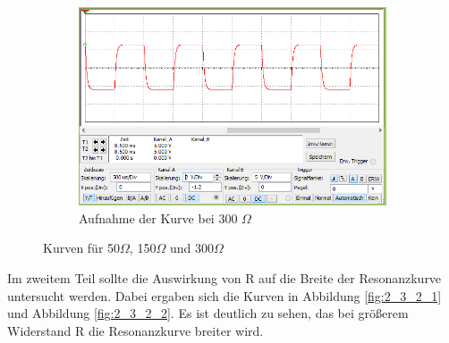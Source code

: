 \documentclass[12pt,a4paper]{article}
\begin{document}
\begin{figure}[H]
        \hfill
        \begin{subfigure}[b]{0.28\textwidth}
                \includegraphics[width=\textwidth , scale = 0.4]{2_3_widerstand_300Ohm.PNG}
                \caption[Aufnahme der Kurve bei 300 $\Omega$]{Aufnahme der Kurve bei 300 $\Omega$}
  				\label{fig:2_3_300}
        \end{subfigure}
        \caption{Kurven  für 50$\Omega$, 150$\Omega$ und 300$\Omega$}
        \label{fig:2_3_1}
\end{figure}


Im zweitem Teil sollte die Auswirkung von R auf die Breite der Resonanzkurve untersucht werden. Dabei ergaben sich die Kurven in Abbildung \ref{fig:2_3_2_1} und Abbildung \ref{fig:2_3_2_2}. Es ist deutlich zu sehen, das bei größerem Widerstand R die Resonanzkurve breiter wird.
\end{document}
